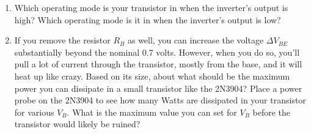 \begin{enumerate}[wide]
\item Which operating mode is your transistor in when the inverter's output is high?  Which operating mode is it in when  the inverter's output is low?  

\item If you remove the resistor $R_B$ as well, you can increase the voltage $\Delta V_{BE}$ substantially beyond the nominal 0.7 volts.  However, when you do so, you'll pull a lot of current through the transistor, mostly from the base, and it will heat up like crazy.  Based on its size, about what should be the maximum power you can dissipate in a small transistor like the 2N3904?  Place a power probe on the 2N3904 to see how many Watts are dissipated in your transistor for various $V_B$.  What is the maximum value you can set for $V_B$ before the transistor would likely be ruined?


\end{enumerate}










